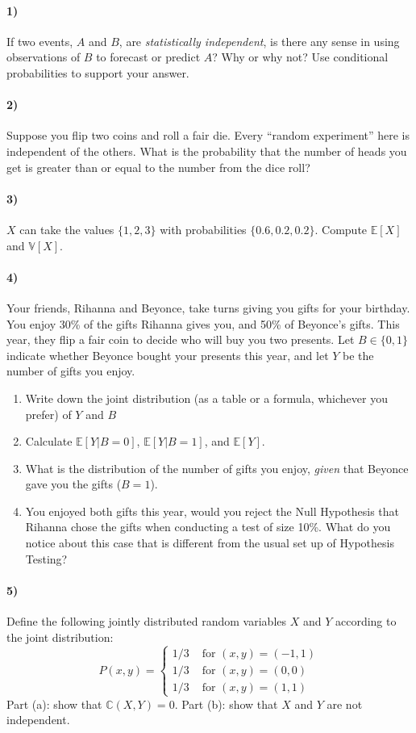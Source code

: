 \documentclass[12pt]{article}
\newcommand\BB{\mathbb}
\newcommand\EE{\mathbb{E}}
\newcommand\barr{\begin{array}}
\newcommand\earr{\end{array}}
\numberwithin{equation}{section}
\numberwithin{figure}{section}
\numberwithin{table}{section}
\begin{document}
\paragraph{1)} If two events, $A$ and $B$, are \emph{statistically independent}, is there any sense in using observations of $B$ to forecast or predict $A$? Why or why not? Use conditional probabilities to support your answer.

\paragraph{2)} Suppose you flip two coins and roll a fair die. Every ``random experiment'' here is independent of the others. What is the probability that the number of heads you get is greater than or equal to the number from the dice roll?

\paragraph{3)} $X$ can take the values $\{1,2,3\}$ with probabilities $\{0.6,0.2,0.2\}$. Compute $\EE[X]$ and $\BB{V}[X]$.


\paragraph{4)} Your friends, Rihanna and Beyonce, take turns giving you gifts for your birthday. You enjoy 30\% of the gifts Rihanna gives you, and 50\% of Beyonce's gifts. This year, they flip a fair coin to decide who will buy you two presents. Let $B\in\{0,1\}$ indicate whether Beyonce bought your presents this year, and let $Y$ be the number of gifts you enjoy.
\begin{enumerate}
\item Write down the joint distribution (as a table or a formula, whichever you prefer) of $Y$ and $B$
\item Calculate $\EE[Y|B=0]$, $\EE[Y|B=1]$, and $\EE[Y]$.
\item What is the distribution of the number of gifts you enjoy, \emph{given} that Beyonce gave you the gifts ($B=1$).
\item You enjoyed both gifts this year, would you reject the Null Hypothesis that Rihanna chose the gifts when conducting a test of size 10\%. What do you notice about this case that is different from the usual set up of Hypothesis Testing?
\end{enumerate}

\paragraph{5)} Define the following jointly distributed random variables $X$ and $Y$ according to the joint distribution:
\[ P(x,y) = \left\{\barr{ll} 1/3 &\text{ for } (x,y)=(-1,1) \\ 1/3 &\text{ for } (x,y)=(0,0) \\ 1/3 &\text{ for } (x,y)=(1,1) \earr\right. \]
Part (a): show that $\BB{C}(X,Y)=0$. Part (b): show that $X$ and $Y$ are not independent.
\end{document}
